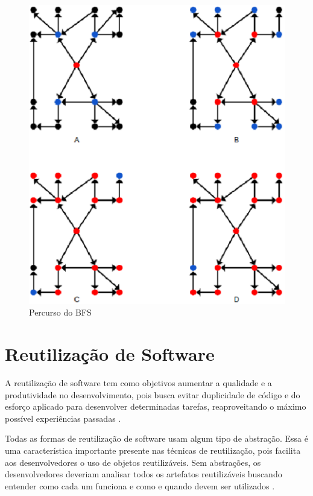\begin{figure}[!h]
	\centering
	\includegraphics[scale=0.55]{figuras/capitulo2/bfs.eps}
	\caption[Percurso do BFS]{Percurso do BFS \cite{Brassard:1988}}
	\label{bfs}
\end{figure}

\section{Reutilização de Software}

A reutilização de software tem como objetivos aumentar a qualidade e a produtividade no desenvolvimento, pois busca evitar duplicidade de código e do esforço aplicado para desenvolver determinadas tarefas, reaproveitando o máximo possível experiências passadas \cite{Lucredio:2009}.

Todas as formas de reutilização de software usam algum tipo de abstração.  Essa é uma característica importante presente nas técnicas de reutilização, pois facilita aos desenvolvedores o uso de objetos reutilizáveis. Sem abstrações, os desenvolvedores deveriam analisar todos os artefatos reutilizáveis buscando entender como cada um funciona e como e quando devem ser utilizados \cite{Krueger:1992}.

